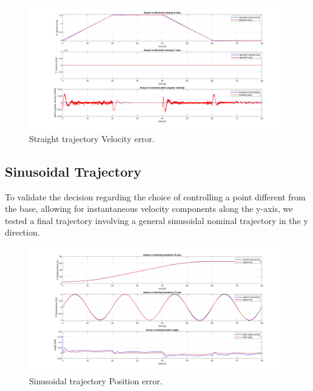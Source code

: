 \begin{figure}
    \centering
    \includegraphics[width=1\linewidth]{Images/x-trajectory/Velocity_error.jpg}
    \caption{Straight trajectory Velocity error.}
    \label{fig:Straight trajectory Velocity error}
\end{figure}

\subsection{Sinusoidal Trajectory}
\label{subsec:Sinusoidal Trajectory}

To validate the decision regarding the choice of controlling a point different from the base, allowing for instantaneous velocity components along the y-axis, we tested a final trajectory involving a general sinusoidal nominal trajectory in the y direction.

\begin{figure}
    \centering
    \includegraphics[width=1\linewidth]{Images/sine trajectory/Position_error.jpg}
    \caption{Sinusoidal trajectory Position error.}
    \label{fig:Sinusoidal trajectory Position error}
\end{figure}

